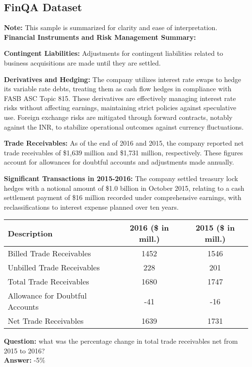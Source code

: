 \documentclass[logo,msc]{infthesis}           %
\begin{document}
\subsection{FinQA Dataset}
\begin{tcolorbox}[
    colback=blue!5!white, %
    colframe=gray, %
    fonttitle=\bfseries, %
    breakable, %
    sharp corners, %
    boxsep=10pt, %
    left=10pt, %
    right=10pt, %
    top=10pt, %
    bottom=10pt %
]
\textbf{Note:} This sample is summarized for clarity and ease of interpretation. \\
\textbf{Financial Instruments and Risk Management Summary:}

\textbf{Contingent Liabilities:}
Adjustments for contingent liabilities related to business acquisitions are made until they are settled.

\textbf{Derivatives and Hedging:}
The company utilizes interest rate swaps to hedge its variable rate debts, treating them as cash flow hedges in compliance with FASB ASC Topic 815. These derivatives are effectively managing interest rate risks without affecting earnings, maintaining strict policies against speculative use. Foreign exchange risks are mitigated through forward contracts, notably against the INR, to stabilize operational outcomes against currency fluctuations.

\textbf{Trade Receivables:}
As of the end of 2016 and 2015, the company reported net trade receivables of \$1,639 million and \$1,731 million, respectively. These figures account for allowances for doubtful accounts and adjustments made annually.

\textbf{Significant Transactions in 2015-2016:}
The company settled treasury lock hedges with a notional amount of \$1.0 billion in October 2015, relating to a cash settlement payment of \$16 million recorded under comprehensive earnings, with reclassifications to interest expense planned over ten years.

\begin{tabular}{lcc}
\toprule
\textbf{Description} & \textbf{2016 (\$ in mill.)} & \textbf{2015 (\$ in mill.)} \\
\midrule
Billed Trade Receivables & 1452 & 1546 \\
Unbilled Trade Receivables & 228 & 201 \\
Total Trade Receivables & 1680 & 1747 \\
Allowance for Doubtful Accounts & -41 & -16 \\
Net Trade Receivables & 1639 & 1731 \\
\bottomrule
\end{tabular}


\textbf{Question:} what was the percentage change in total trade receivables net from 2015 to 2016? \\
\textbf{Answer:} -5\%
\end{tcolorbox}
\end{document}
